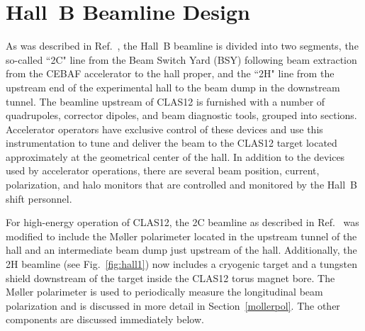 \section{Hall~B Beamline Design}
\label{beamlinedesign}

As was described in Ref.~\cite{HPSBeamline}, the Hall~B beamline is divided into two segments, the so-called
``2C" line from the Beam Switch Yard (BSY) following beam extraction from the CEBAF accelerator to the hall
proper, and the ``2H" line from the upstream end of the experimental hall to the beam dump in the downstream
tunnel. The beamline upstream of CLAS12 is furnished with a number of quadrupoles, corrector dipoles, and beam
diagnostic tools, grouped into sections. Accelerator operators have exclusive control of these devices and use
this instrumentation to tune and deliver the beam to the CLAS12 target located approximately at the geometrical
center of the hall. In addition to the devices used by accelerator operations, there are several beam position,
current, polarization, and halo monitors that are controlled and monitored by the Hall~B shift personnel. 

For high-energy operation of CLAS12, the 2C beamline as described in Ref.~\cite{HPSBeamline} was modified to
include the M{\o}ller polarimeter located in the upstream tunnel of the hall and an intermediate beam dump just
upstream of the hall. Additionally, the 2H beamline (see Fig.~\ref{fig:hall1}) now includes a cryogenic target and a
tungsten shield downstream of the target inside the CLAS12 torus magnet bore. The M{\o}ller polarimeter is used
to periodically measure the longitudinal beam polarization and is discussed in more detail in Section~\ref{mollerpol}.
The other components are discussed immediately below.


